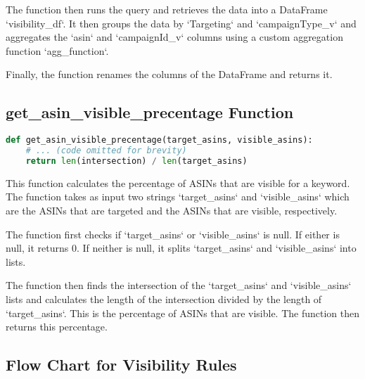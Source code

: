 The function then runs the query and retrieves the data into a DataFrame `visibility\_df`. It then groups the data by `Targeting` and `campaignType\_v` and aggregates the `asin` and `campaignId\_v` columns using a custom aggregation function `agg\_function`.

Finally, the function renames the columns of the DataFrame and returns it.

\subsection{get\_asin\_visible\_precentage Function}

\begin{lstlisting}[language=Python]
def get_asin_visible_precentage(target_asins, visible_asins):
    # ... (code omitted for brevity)
    return len(intersection) / len(target_asins)
\end{lstlisting}

This function calculates the percentage of ASINs that are visible for a keyword. The function takes as input two strings `target\_asins` and `visible\_asins` which are the ASINs that are targeted and the ASINs that are visible, respectively.

The function first checks if `target\_asins` or `visible\_asins` is null. If either is null, it returns 0. If neither is null, it splits `target\_asins` and `visible\_asins` into lists.

The function then finds the intersection of the `target\_asins` and `visible\_asins` lists and calculates the length of the intersection divided by the length of `target\_asins`. This is the percentage of ASINs that are visible. The function then returns this percentage.


\subsection{Flow Chart for Visibility Rules}

